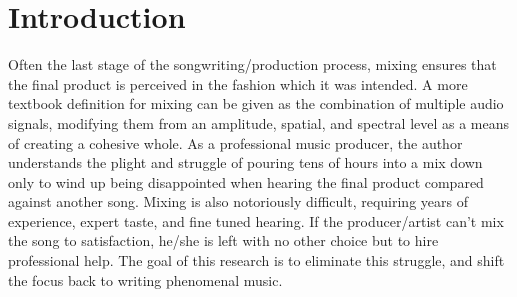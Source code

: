 \documentclass{article}
\title{\papertitle}
\begin{document}
\capstartfalse
\maketitle
\capstarttrue

\begin{abstract}
In this paper, an autonomous mixing system is implemented using machine learning to estimate and apply fader weighting coefficients.  While in previous research this algorithm was shown to be an effective form of autonomous mixing, the goal of this paper is to build upon the previous implementation by expanding the extracted feature set, and comparing the models efficiency across genre.  In this off-line MATLAB implementation, audio examples are provided to show the result of multiple linear regression as a prediction model, and its accuracy is calculated via the mean squared error between the ground truth and the predicted coefficients.  The current implementations validity is evaluated and future research directions are established. To download the code used to run this experiment, visit https://github.com/bombsandbottles/Automatic-Mixing-Using-Multiple-Linear-Regression.
\end{abstract}


\section{Introduction}
\label{sec:Introduction}

Often the last stage of the songwriting/production process, mixing ensures that the final product is perceived in the fashion which it was intended.  A more textbook definition for mixing can be given as the combination of multiple audio signals, modifying them from an amplitude, spatial, and spectral level as a means of creating a cohesive whole.  As a professional music producer, the author understands the plight and struggle of pouring tens of hours into a mix down only to wind up being disappointed when hearing the final product compared against another song.  Mixing is also notoriously difficult, requiring years of experience, expert taste, and fine tuned hearing.  If the producer/artist can't mix the song to satisfaction, he/she is left with no other choice but to hire professional help.  The goal of this research is to eliminate this struggle, and shift the focus back to writing phenomenal music.
\end{document}
